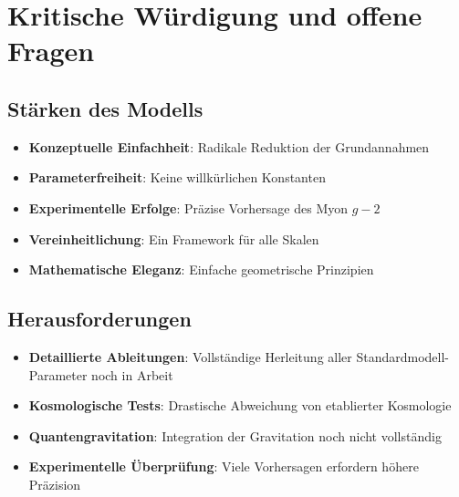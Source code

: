	\begin{table}[H]
		\centering
		\caption{Vergleich zwischen Standardmodell und T0-Modell}
	\end{table}
	
	\section{Kritische Würdigung und offene Fragen}
	
	\subsection{Stärken des Modells}
	
	\begin{itemize}
		\item \textbf{Konzeptuelle Einfachheit}: Radikale Reduktion der Grundannahmen
		\item \textbf{Parameterfreiheit}: Keine willkürlichen Konstanten
		\item \textbf{Experimentelle Erfolge}: Präzise Vorhersage des Myon $g-2$
		\item \textbf{Vereinheitlichung}: Ein Framework für alle Skalen
		\item \textbf{Mathematische Eleganz}: Einfache geometrische Prinzipien
	\end{itemize}
	
	\subsection{Herausforderungen}
	
	\begin{itemize}
		\item \textbf{Detaillierte Ableitungen}: Vollständige Herleitung aller Standardmodell-Parameter noch in Arbeit
		\item \textbf{Kosmologische Tests}: Drastische Abweichung von etablierter Kosmologie
		\item \textbf{Quantengravitation}: Integration der Gravitation noch nicht vollständig
		\item \textbf{Experimentelle Überprüfung}: Viele Vorhersagen erfordern höhere Präzision
	\end{itemize}
	